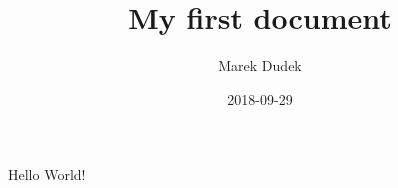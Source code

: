 \documentclass{article}
\title{My first document}
\date{2018-09-29}
\author{Marek Dudek}
\begin{document}
    \maketitle
    \newpage
    Hello World!
\end{document}

